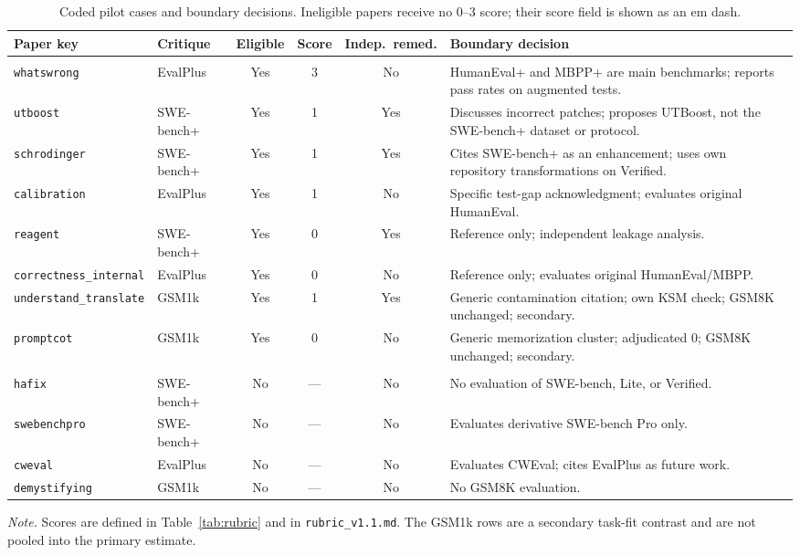 \documentclass[11pt,a4paper]{article}
\newcommand{\key}[1]{\texttt{\small #1}}
\begin{document}
\begin{table}[t]
\centering
\caption{Coded pilot cases and boundary decisions. Ineligible papers receive no 0--3 score; their score field is shown as an em dash.}
\label{tab:cases}
\footnotesize
\begin{threeparttable}
\begin{tabularx}{\textwidth}{@{}>{\raggedright\arraybackslash}p{4.05cm} l c c c >{\raggedright\arraybackslash}X@{}}
\toprule
Paper key & Critique & Eligible & Score & Indep.\ remed. & Boundary decision \\
\midrule
\multicolumn{6}{@{}l}{\textit{Panel A: eligible papers}} \\
\addlinespace
\key{whatswrong} & EvalPlus & Yes & 3 & No & HumanEval+ and MBPP+ are main benchmarks; reports pass rates on augmented tests. \\
\key{utboost} & SWE-bench+ & Yes & 1 & Yes & Discusses incorrect patches; proposes UTBoost, not the SWE-bench+ dataset or protocol. \\
\key{schrodinger} & SWE-bench+ & Yes & 1 & Yes & Cites SWE-bench+ as an enhancement; uses own repository transformations on Verified. \\
\key{calibration} & EvalPlus & Yes & 1 & No & Specific test-gap acknowledgment; evaluates original HumanEval. \\
\key{reagent} & SWE-bench+ & Yes & 0 & Yes & Reference only; independent leakage analysis. \\
\key{correctness\_internal} & EvalPlus & Yes & 0 & No & Reference only; evaluates original HumanEval/MBPP. \\
\key{understand\_translate} & GSM1k & Yes & 1 & Yes & Generic contamination citation; own KSM check; GSM8K unchanged; secondary. \\
\key{promptcot} & GSM1k & Yes & 0 & No & Generic memorization cluster; adjudicated 0; GSM8K unchanged; secondary. \\
\addlinespace
\multicolumn{6}{@{}l}{\textit{Panel B: ineligible papers}} \\
\addlinespace
\key{hafix} & SWE-bench+ & No & --- & No & No evaluation of SWE-bench, Lite, or Verified. \\
\key{swebenchpro} & SWE-bench+ & No & --- & No & Evaluates derivative SWE-bench Pro only. \\
\key{cweval} & EvalPlus & No & --- & No & Evaluates CWEval; cites EvalPlus as future work. \\
\key{demystifying} & GSM1k & No & --- & No & No GSM8K evaluation. \\
\bottomrule
\end{tabularx}
\begin{tablenotes}[flushleft]\footnotesize
\item \textit{Note.} Scores are defined in Table~\ref{tab:rubric} and in \texttt{rubric\_v1.1.md}. The GSM1k rows are a secondary task-fit contrast and are not pooled into the primary estimate.
\end{tablenotes}
\end{threeparttable}
\end{table}
\end{document}
